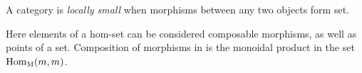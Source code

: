 \begin{definition}
    A category is \textit{locally small} when morphisms between any two objects form set.
\end{definition}

\begin{remark}
    Here elements of a hom-set can be considered composable morphisms, as well as points of a set. Composition of morphisms in  is the monoidal product in the set $\mathrm{Hom}_{{\normalfont\textsc{M}}}(m, m)$.
\end{remark}
